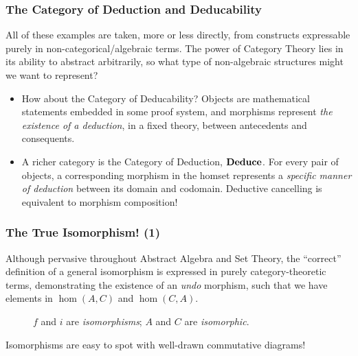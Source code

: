 \documentclass{beamer}
\numberwithin{figure}{section}
\begin{document}
\begin{frame}
        \frametitle{The Category of Deduction and Deducability}
        All of these examples are taken, more or less directly, from constructs
        expressable purely in non-categorical/algebraic terms. The power of
        Category Theory lies in its ability to abstract arbitrarily, so what
        type of non-algebraic structures might we want to represent?
        \pause
        \begin{itemize}
                \item How about the Category of Deducability? Objects are
                        mathematical statements embedded in some proof system,
                        and morphisms represent \emph{the existence of a
                        deduction}, in a fixed theory, between antecedents and
                        consequents.
                \item A richer category is the Category of Deduction,
                        $\operatorname{\mathbf{Deduce}}$. For every pair of objects, a corresponding
                        morphism in the homset represents a \emph{specific
                        manner of deduction} between its domain and codomain.
                        Deductive cancelling is equivalent to morphism
                        composition!
        \end{itemize}
\end{frame}

\begin{frame}
        \frametitle{The True Isomorphism! (1)}
        Although pervasive throughout Abstract Algebra and Set Theory, the
        ``correct'' definition of a general isomorphism is expressed in purely
        category-theoretic terms, demonstrating the existence of an \emph{undo}
        morphism, such that we have elements in $\hom(A,C)$ and
        $\hom(C,A)$.
        \pause
        \begin{figure}
                \caption{$f$ and $i$ are \emph{isomorphisms}; $A$ and $C$ are
                        \emph{isomorphic}.}
        \end{figure}
        \pause
        Isomorphisms are easy to spot with well-drawn commutative diagrams!
\end{frame}
\end{document}
